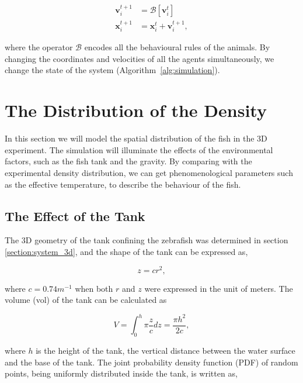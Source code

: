 \documentclass[11pt,twoside]{report}
\begin{document}
\begin{equation*}
\begin{split}
	\mathbf{v}_{i}^{t+1}
	&= \mathcal{B} [\mathbf{v}_{i}^t] \\
	\mathbf{x}_i^{t+1}
	&= \mathbf{x}_i^{t} + \mathbf{v}_i^{t+1},
\end{split}
\end{equation*}

\noindent where the operator $\mathcal{B}$ encodes all the behavioural rules of the animals. By changing the coordinates and velocities of all the agents simultaneously, we change the state of the system (Algorithm~\ref{alg:simulation}).


\section{The Distribution of the Density}
\label{section:simulate-density}

In this section we will model the spatial distribution of the fish in the 3D experiment. The simulation will illuminate the effects of the environmental factors, such as the fish tank and the gravity. By comparing with the experimental density distribution, we can get phenomenological parameters such as the effective temperature, to describe the behaviour of the fish.



\subsection{The Effect of the Tank}
\label{section:sim-mc-tank}

The 3D geometry of the tank confining the zebrafish was determined in section \ref{section:system_3d}, and the shape of the tank can be expressed as,

\begin{equation*}
	z = c r^2,	
\end{equation*}


\noindent where $c=0.74 m^{-1}$ when both $r$ and $z$ were expressed in the unit of meters. The volume (\gls{vol}) of the tank can be calculated as

\begin{equation*}
	V = \int_{0}^{h}{\pi \frac{z}{c}} dz
	  = \frac{\pi h^2}{2 c},	
\end{equation*}


\noindent where $h$ is the height of the tank, the vertical distance between the water surface and the base of the tank. The joint probability density function (PDF) of random points, being uniformly distributed inside the tank, is written as,
\end{document}
